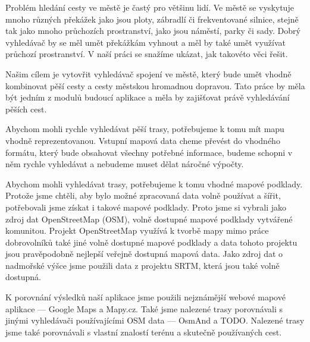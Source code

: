 
Problém hledání cesty ve městě je častý pro většinu lidí. Ve městě se vyskytuje
mnoho různých překážek jako jsou ploty, zábradlí či frekventované silnice,
stejně tak jako mnoho průchozích prostranství, jako jsou náměstí, parky či sady.
Dobrý vyhledávač by se měl umět překážkám vyhnout a měl by také umět využívat
průchozí prostranství. V naší práci se snažíme ukázat, jak takovéto věci řešit.

Našim cílem je vytovřit vyhledávač spojení ve městě, který bude umět vhodně
kombinovat pěší cesty a cesty městskou hromadnou dopravou. Tato práce by měla
být jedním z modulů budoucí aplikace a měla by zajišťovat právě vyhledávání
pěších cest.

Abychom mohli rychle vyhledávat pěší trasy, potřebujeme k tomu mít mapu vhodně
reprezentovanou. Vstupní mapová data cheme převést do vhodného formátu, který
bude obsahovat všechny potřebné informace, budeme schopni v něm rychle
vyhledávat a nebudeme muset dělat náročné výpočty. 

Abychom mohli vyhledávat trasy, potřebujeme k tomu vhodné mapové podklady.
Protože jsme chtěli, aby bylo možné zpracovaná data volně používat a šířit, 
potřebovali jsme získat i takové mapové podklady. Proto jsme si vybrali jako
zdroj dat OpenStreetMap (OSM), volně dostupné mapové podklady vytvářené komunitou. 
Projekt OpenStreetMap využívá k tvorbě mapy mimo práce dobrovolníků také jiné
volně dostupné mapové podklady a data tohoto projektu jsou pravěpodobně nejlepší
veřejně dostupná mapová data. Jako zdroj dat o nadmořské výšce jsme použili data
z projektu SRTM, která jsou také volně dostupná.

K porovnání výsledků naší aplikace jsme použili nejznámější webové mapové
aplikace --- Google Maps a Mapy.cz. Také jsme nalezené trasy porovnávali s jinými
vyhledávači používajícími OSM data --- OsmAnd a TODO. Nalezené trasy jsme také
porovnávali s vlastní znalostí terénu a skutečně používaných cest.

